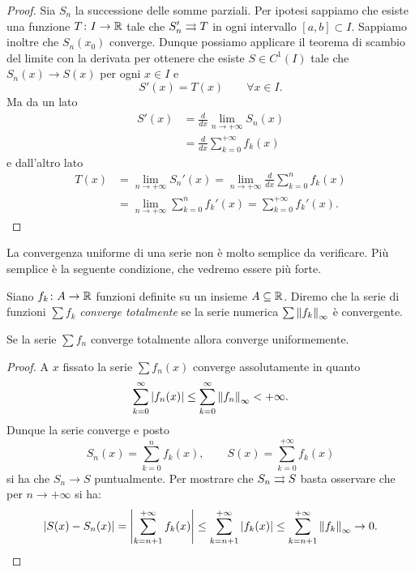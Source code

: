 \begin{proof}
\mymark{**}
Sia $S_n$ la successione delle somme parziali. Per ipotesi sappiamo che esiste una funzione $T\colon I \to {\mathbb R}$ tale che $S_n' \rightrightarrows T$ in ogni intervallo $[a,b]\subset I$.
Sappiamo inoltre che $S_n(x_0)$ converge.
Dunque possiamo applicare il teorema di scambio del limite con la derivata per ottenere che esiste $S\in C^1(I)$ tale che
 $S_n(x)\to S(x)$ per ogni $x\in I$ e
\[
   S'(x) = T(x) \qquad \forall x\in I.
\]
Ma da un lato
\begin{align*}
S'(x)
&= \frac{d}{dx} \lim_{n\to +\infty} S_n(x) \\
&= \frac{d}{dx} \sum_{k=0}^{+\infty} f_k(x)
\end{align*}
e dall'altro lato
\begin{align*}
T(x)
&= \lim_{n\to +\infty} S_n'(x)
 = \lim_{n\to +\infty} \frac{d}{dx} \sum_{k=0}^n f_k(x) \\
&= \lim_{n\to +\infty} \sum_{k=0}^n f_k'(x)
 = \sum_{k=0}^{+\infty} f_k'(x).
\end{align*}
\end{proof}

La convergenza uniforme di una serie non è molto semplice da verificare. Più semplice è la seguente condizione, che vedremo essere più forte.

\begin{definition}
\mymark{***}
Siano $f_k\colon A \to {\mathbb R}$ funzioni definite su un insieme $A\subseteq {\mathbb R}$. Diremo che la serie di funzioni $\sum f_k$
\emph{converge totalmente}
se la serie numerica $\sum {\left\Vert f_k\right\Vert}_\infty$
è convergente.
\end{definition}

\begin{theorem}
\mymark{***}
Se la serie $\sum f_n$ converge totalmente allora converge uniformemente.
\end{theorem}
%
\begin{proof}
\mymark{***}
A $x$ fissato
la serie $\sum f_n(x)$ converge assolutamente in quanto
\[
  \sum_{k=0}^\infty {\left|f_n(x)\right|}
  \le \sum_{k=0}^\infty {\left\Vert f_n\right\Vert}_\infty < +\infty.
\]
Dunque la serie converge e posto
\[
  S_n(x) = \sum_{k=0}^n f_k(x), \qquad
  S(x) = \sum_{k=0}^{+\infty} f_k(x)
\]
si ha che $S_n\to S$ puntualmente.
Per mostrare che $S_n \rightrightarrows S$ basta osservare che per
$n\to +\infty$ si ha:
\[
  {\left|S(x) - S_n(x)\right|}
  = {\left|\sum_{k=n+1}^{+\infty} f_k(x)\right|}
  \le \sum_{k=n+1}^{+\infty}{\left|f_k(x)\right|}
  \le \sum_{k=n+1}^{+\infty}{\left\Vert f_k\right\Vert}_\infty \to 0.
\]
\end{proof}

